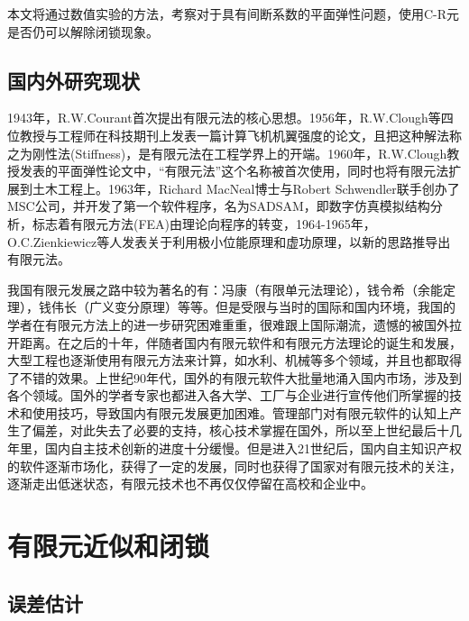 \documentclass[a4paper,UTF8,titlepage]{ctexart}
\begin{document}
本文将通过数值实验的方法，考察对于具有间断系数的平面弹性问题，使用C-R元是否仍可以解除闭锁现象。

\subsection{国内外研究现状}

1943年，R.W.Courant首次提出有限元法的核心思想。1956年，R.W.Clough等四位教授与工程师在科技期刊上发表一篇计算飞机机翼强度的论文，且把这种解法称之为刚性法(Stiffness)，是有限元法在工程学界上的开端。1960年，R.W.Clough教授发表的平面弹性论文中，“有限元法”这个名称被首次使用，同时也将有限元法扩展到土木工程上。1963年，Richard MacNeal博士与Robert Schwendler联手创办了MSC公司，并开发了第一个软件程序，名为SADSAM，即数字仿真模拟结构分析，标志着有限元方法(FEA)由理论向程序的转变，1964-1965年，O.C.Zienkiewicz等人发表关于利用极小位能原理和虚功原理，以新的思路推导出有限元法。

我国有限元发展之路中较为著名的有：冯康（有限单元法理论），钱令希（余能定理），钱伟长（广义变分原理）等等。但是受限与当时的国际和国内环境，我国的学者在有限元方法上的进一步研究困难重重，很难跟上国际潮流，遗憾的被国外拉开距离。在之后的十年，伴随者国内有限元软件和有限元方法理论的诞生和发展，大型工程也逐渐使用有限元方法来计算，如水利、机械等多个领域，并且也都取得了不错的效果。上世纪90年代，国外的有限元软件大批量地涌入国内市场，涉及到各个领域。国外的学者专家也都进入各大学、工厂与企业进行宣传他们所掌握的技术和使用技巧，导致国内有限元发展更加困难。管理部门对有限元软件的认知上产生了偏差，对此失去了必要的支持，核心技术掌握在国外，所以至上世纪最后十几年里，国内自主技术创新的进度十分缓慢。但是进入21世纪后，国内自主知识产权的软件逐渐市场化，获得了一定的发展，同时也获得了国家对有限元技术的关注，逐渐走出低迷状态，有限元技术也不再仅仅停留在高校和企业中。

\section{有限元近似和闭锁}

\subsection{误差估计}
\end{document}
